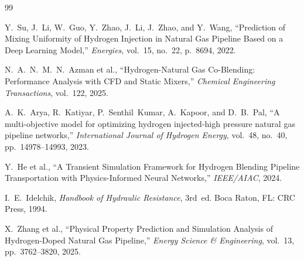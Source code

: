 \documentclass[12pt, a4paper]{report}
\begin{document}
\begin{thebibliography}{99}

Y.~Su, J.~Li, W.~Guo, Y.~Zhao, J.~Li, J.~Zhao, and Y.~Wang, ``Prediction of Mixing Uniformity of Hydrogen Injection in Natural Gas Pipeline Based on a Deep Learning Model,'' \textit{Energies}, vol.~15, no.~22, p.~8694, 2022.

N.~A.~N.~M.~N.~Azman et al., ``Hydrogen-Natural Gas Co-Blending: Performance Analysis with CFD and Static Mixers,'' \textit{Chemical Engineering Transactions}, vol.~122, 2025.

A.~K.~Arya, R.~Katiyar, P.~Senthil~Kumar, A.~Kapoor, and D.~B.~Pal, ``A multi-objective model for optimizing hydrogen injected-high pressure natural gas pipeline networks,'' \textit{International Journal of Hydrogen Energy}, vol.~48, no.~40, pp.~14978--14993, 2023.

Y.~He et al., ``A Transient Simulation Framework for Hydrogen Blending Pipeline Transportation with Physics-Informed Neural Networks,'' \textit{IEEE/AIAC}, 2024.

I.~E.~Idelchik, \textit{Handbook of Hydraulic Resistance}, 3rd~ed. Boca Raton, FL: CRC Press, 1994.

X.~Zhang et al., ``Physical Property Prediction and Simulation Analysis of Hydrogen-Doped Natural Gas Pipeline,'' \textit{Energy Science \& Engineering}, vol.~13, pp.~3762--3820, 2025.

\end{thebibliography}
\end{document}
